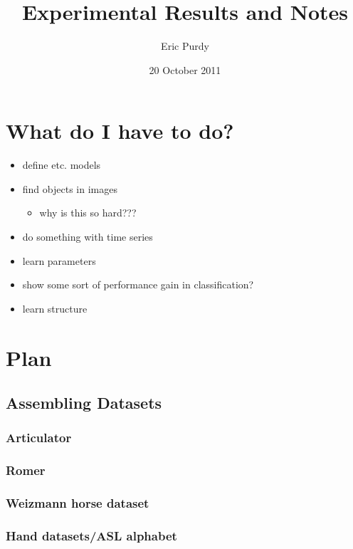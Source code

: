 \documentclass{book}
\begin{document}
\title{Experimental Results and Notes}
\author{Eric Purdy}
\date{20 October 2011}
\maketitle

\setcounter{tocdepth}{3}
\tableofcontents
\vspace*{1cm}


\chapter{What do I have to do?}
\label{sec-1}


\begin{itemize}
\item define etc. models
\item find objects in images

\begin{itemize}
\item why is this so hard???
\end{itemize}

\item do something with time series
\item learn parameters
\item show some sort of performance gain in classification?
\item learn structure
\end{itemize}
\chapter{Plan}
\label{sec-2}

\setcounter{section}{-1}
\section{Assembling Datasets}
\label{sec-2_1}
\subsection{Articulator}
\label{sec-2_1_1}
\subsection{Romer}
\label{sec-2_1_2}
\subsection{Weizmann horse dataset}
\label{sec-2_1_3}
\subsection{Hand datasets/ASL alphabet}
\label{sec-2_1_4}
\end{document}
